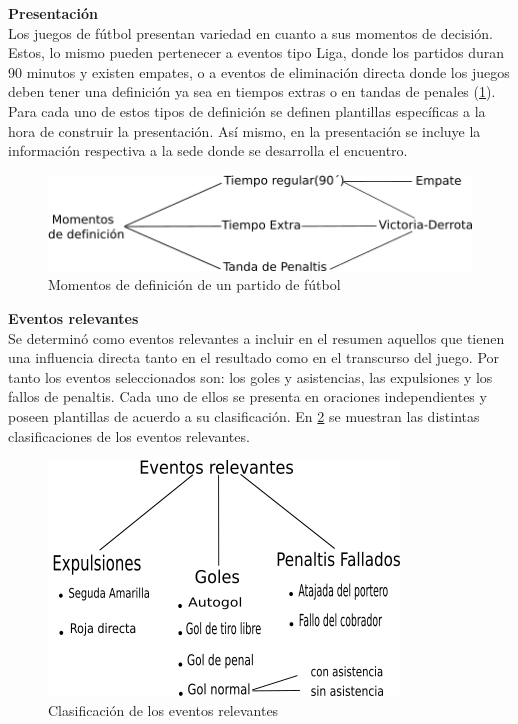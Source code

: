     \textbf{Presentación}\\

    Los juegos de fútbol presentan variedad en cuanto a sus momentos de decisión. Estos, lo mismo pueden pertenecer a eventos tipo Liga, donde los partidos 
duran 90 minutos y existen empates, o a eventos de eliminación directa donde los juegos deben tener una definición ya sea en tiempos extras 
o en tandas de penales (\ref{fig_momentos_definicion}). Para cada uno de estos tipos de 
definición se definen plantillas específicas a la hora de construir la presentación. Así mismo, en la presentación se incluye la información 
respectiva a la sede donde se desarrolla el encuentro.\\

    \begin{figure}[!]
        \begin{center}
            \includegraphics[scale=1]{Graphics/momentodef.png}
        \end{center}
        \caption{Momentos de definición de un partido de fútbol}
        \label{fig_momentos_definicion}
    \end{figure}

    \textbf{Eventos relevantes}\\

    Se determinó como eventos relevantes a incluir en el resumen aquellos que tienen una influencia directa 
tanto en el resultado como en el transcurso del juego. Por tanto los eventos seleccionados son: los goles y asistencias, 
las expulsiones y los fallos de penaltis. Cada uno de ellos se presenta en oraciones independientes y poseen plantillas de acuerdo 
a su clasificación. En \ref{fig_clasificacioneventos} se muestran las distintas clasificaciones de los eventos relevantes.\\


    \begin{figure}[!]
        \begin{center}
            \includegraphics[scale=0.9]{Graphics/clasificacioneventosrel.png}
        \end{center}
        \caption{Clasificación de los eventos relevantes}
        \label{fig_clasificacioneventos}
    \end{figure}

